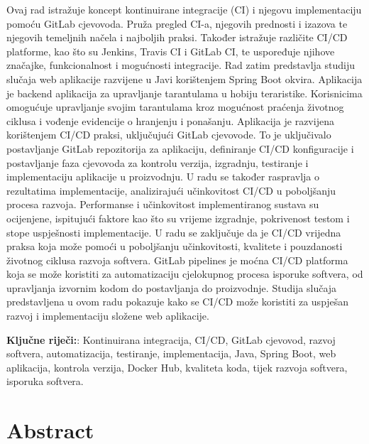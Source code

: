 \documentclass[a4paper,12pt,oneside]{article}
\begin{document}
Ovaj rad istražuje koncept kontinuirane integracije (CI) i njegovu implementaciju pomoću GitLab cjevovoda. Pruža pregled CI-a, njegovih prednosti i izazova te njegovih temeljnih načela i najboljih praksi. Također istražuje različite CI/CD platforme, kao što su Jenkins, Travis CI i GitLab CI, te uspoređuje njihove značajke, funkcionalnost i mogućnosti integracije. Rad zatim predstavlja studiju slučaja web aplikacije razvijene u Javi korištenjem Spring Boot okvira. Aplikacija je backend aplikacija za upravljanje tarantulama u hobiju teraristike. Korisnicima omogućuje upravljanje svojim tarantulama kroz mogućnost praćenja životnog ciklusa i vođenje evidencije o hranjenju i ponašanju. Aplikacija je razvijena korištenjem CI/CD praksi, uključujući GitLab cjevovode. To je uključivalo postavljanje GitLab repozitorija za aplikaciju, definiranje CI/CD konfiguracije i postavljanje faza cjevovoda za kontrolu verzija, izgradnju, testiranje i implementaciju aplikacije u proizvodnju. U radu se također raspravlja o rezultatima implementacije, analizirajući učinkovitost CI/CD u poboljšanju procesa razvoja. Performanse i učinkovitost implementiranog sustava su ocijenjene, ispitujući faktore kao što su vrijeme izgradnje, pokrivenost testom i stope uspješnosti implementacije.
U radu se zaključuje da je CI/CD vrijedna praksa koja može pomoći u poboljšanju učinkovitosti, kvalitete i pouzdanosti životnog ciklusa razvoja softvera. GitLab pipelines je moćna CI/CD platforma koja se može koristiti za automatizaciju cjelokupnog procesa isporuke softvera, od upravljanja izvornim kodom do postavljanja do proizvodnje. Studija slučaja predstavljena u ovom radu pokazuje kako se CI/CD može koristiti za uspješan razvoj i implementaciju složene web aplikacije.

\bigskip
\noindent\textbf{Klju\v{c}ne rije\v{c}i:}: Kontinuirana integracija, CI/CD, GitLab cjevovod, razvoj softvera, automatizacija, testiranje, implementacija, Java, Spring Boot, web aplikacija, kontrola verzija, Docker Hub, kvaliteta koda, tijek razvoja softvera, isporuka softvera.


\newpage
\section*{Abstract}
\end{document}
